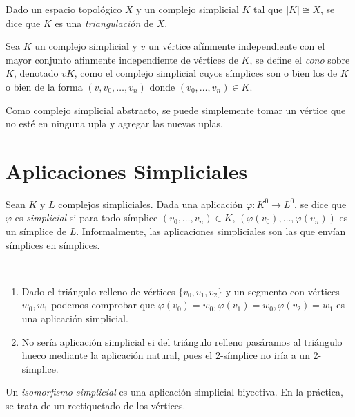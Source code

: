 \documentclass[HS.tex]{subfiles}
\begin{document}
\begin{defi}
Dado un espacio topológico $X$ y un complejo simplicial $K$ tal que $|K|\cong X$, se dice que $K$ es una \emph{triangulación} de $X$. 
\end{defi}

\begin{defi}
Sea $K$ un complejo simplicial y $v$ un vértice afínmente independiente con el mayor conjunto afinmente independiente de vértices de $K$, se define el \emph{cono} sobre $K$, denotado $vK$,  como el complejo simplicial cuyos símplices son o bien los de $K$ o bien de la forma $(v,v_0,\dots, v_n)$ donde $(v_0,\dots, v_n)\in K$. 
\end{defi}

\begin{nota}
Como complejo simplicial abstracto, se puede simplemente tomar un vértice que no esté en ninguna upla y agregar las nuevas uplas.
\end{nota}

\section{Aplicaciones Simpliciales}

\begin{defi}
Sean $K$ y $L$ complejos simpliciales. Dada una aplicación $\varphi:K^0\to L^0$, se dice que $\varphi$ es \emph{simplicial} si para todo símplice $(v_0,\dots, v_n)\in K$, $(\varphi(v_0),\dots, \varphi(v_n))$ es un símplice de $L$. Informalmente, las aplicaciones simpliciales son las que envían símplices en símplices.
\end{defi}

\begin{ej}\
\begin{enumerate}
\item Dado el triángulo relleno de vértices $\{v_0,v_1,v_2\}$ y un segmento con vértices $w_0,w_1$ podemos comprobar que $\varphi(v_0)=w_0, \varphi(v_1)=w_0,\varphi(v_2)=w_1$ es una aplicación simplicial. 

\item No sería aplicación simplicial si del triángulo relleno pasáramos al triángulo hueco mediante la aplicación natural, pues el 2-símplice no iría a un 2-símplice. 
\end{enumerate}
\end{ej}

\begin{defi}
Un \emph{isomorfismo simplicial} es una aplicación simplicial biyectiva. En la práctica, se trata de un reetiquetado de los vértices.
\end{defi}
\end{document}

